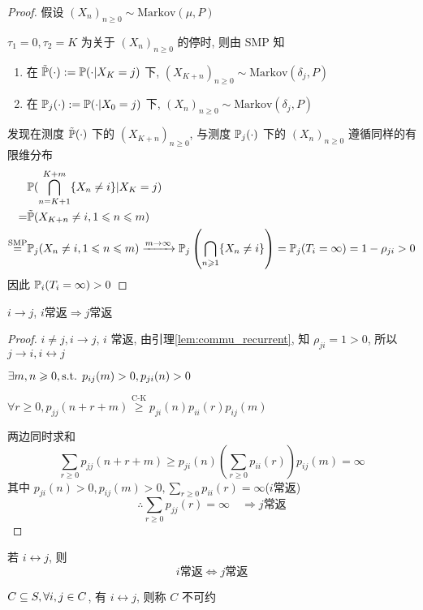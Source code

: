 \begin{proof}
假设 $(X_n)_{n\geq 0}\sim \text{Markov}(\mu,P)$

$\tau_1=0,\tau_2=K$ 为关于 $(X_n)_{n\geq 0}$ 的停时, 则由 SMP 知
\begin{enumerate}
    \item 在 $\tilde{\mathbb{P}}(\cdot):=\mathbb{P}(\cdot|X_K=j)$ 下, $(X_{K+n})_{n\geq 0}\sim \text{Markov}(\delta_j,P)$
    \item 在 $\mathbb{P}_j(\cdot):=\mathbb{P}(\cdot|X_0=j)$ 下, $(X_{n})_{n\geq 0}\sim \text{Markov}(\delta_j,P)$
\end{enumerate}
发现在测度 $\tilde{\mathbb{P}}(\cdot)$ 下的 $(X_{K+n})_{n\geq 0}$, 与测度 $\mathbb{P}_j(\cdot)$ 下的 $(X_n)_{n\geq 0}$ 遵循同样的有限维分布
\[
\begin{aligned}
    &\mathbb{P}(\bigcap_{n=K+1}^{K+m}\{X_n\neq i\}|X_K=j)\\
    =&\tilde{\mathbb{P}}(X_{K+n}\neq i,1\leqslant n\leqslant m)\\
    \overset{\text{SMP}}{=}&\mathbb{P}_j(X_n\neq i,1\leqslant n\leqslant m)\xrightarrow{m\to\infty}\mathbb{P}_j\left(\bigcap_{n\geqslant 1}\{X_n\neq i\}\right)=\mathbb{P}_j(T_i=\infty)=1-\rho_{ji}>0
\end{aligned}
\]
因此 $\mathbb{P}_i(T_i=\infty)>0$
\end{proof}
\begin{corollary}
    $i\to j$, $i$常返$\Rightarrow$$j$常返
\end{corollary}
\begin{proof}
$i\neq j,i\to j$, $i$ 常返, 由引理\ref{lem:commu_recurrent}, 知 $\rho_{ji}=1>0$, 所以 $j\to i, i\leftrightarrow j$

$\exists m,n\geqslant 0, \text{s.t. } p_{ij}(m)>0,p_{ji}(n)>0$

$\forall r\geq 0, p_{jj}(n+r+m)\overset{\text{C-K}}{\geq} p_{ji}(n)p_{ii}(r)p_{ij}(m)$

两边同时求和
\[
\sum_{r\geq 0}p_{jj}(n+r+m)\geq p_{ji}(n)\left(\sum_{r\geq 0}p_{ii}(r)\right)p_{ij}(m)=\infty
\]
其中 $p_{ji}(n)>0,p_{ij}(m)>0,\sum_{r\geq 0}p_{ii}(r)=\infty$($i$常返)
\[
\therefore \sum_{r\geq 0}p_{jj}(r)=\infty\quad \Rightarrow j\text{常返}
\]
\end{proof}

\begin{corollary}\label{cor:trans_recurrent}
    若 $i\leftrightarrow j$, 则 
    \[
    i \text{常返} \iff j \text{常返}
    \]
\end{corollary}

\begin{definition}[集合的不可约]
    $C\subseteq S,\forall i,j\in C$, 有 $i\leftrightarrow j$, 则称 $C$ 不可约
\end{definition}


